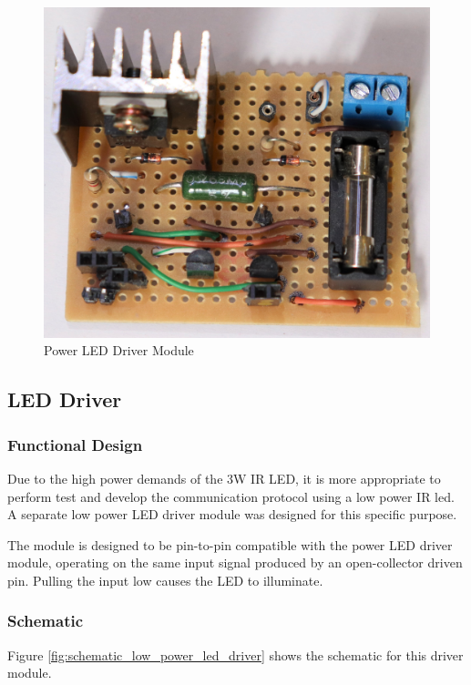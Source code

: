 \begin{figure}[H]
	\centering
	\includegraphics[width=.6\textwidth]{figures/modules/power_led_driver.jpg}
	\caption{Power LED Driver Module}
	\label{fig:module_power_led_driver}
\end{figure}







\subsection{LED Driver}

\subsubsection{Functional Design}
Due to the high power demands of the 3W IR LED, it is more appropriate to perform test and develop the communication protocol using a low power IR led. A separate low power LED driver module was designed for this specific purpose.

The module is designed to be pin-to-pin compatible with the power LED driver module, operating on the same input signal produced by an open-collector driven pin. Pulling the input low causes the LED to illuminate.



\subsubsection{Schematic}
Figure \ref{fig:schematic_low_power_led_driver} shows the schematic for this driver module.

